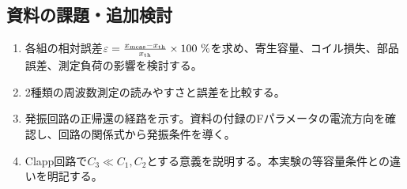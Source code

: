 \documentclass[lualatex,a4paper,10pt]{jlreq}
\begin{document}
\subsection{資料の課題・追加検討}
\begin{enumerate}
\item 各組の相対誤差$\varepsilon=\frac{x_{\mathrm{meas}}-x_{\mathrm{th}}}{x_{\mathrm{th}}}\times100\ \%$を求め、寄生容量、コイル損失、部品誤差、測定負荷の影響を検討する。
\item 2種類の周波数測定の読みやすさと誤差を比較する。
\item 発振回路の正帰還の経路を示す。資料の付録のFパラメータの電流方向を確認し、回路の関係式から発振条件を導く。
\item Clapp回路で$C_3\ll C_1,C_2$とする意義を説明する。本実験の等容量条件との違いを明記する。
\end{enumerate}
\end{document}

